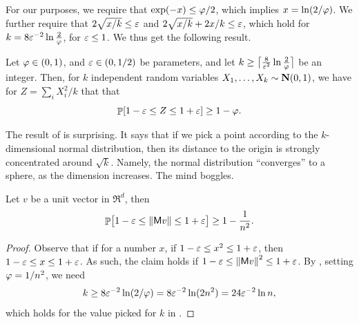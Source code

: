 For our purposes, we require that $\exp(-x) \leq \varphi/2$, which
implies $x = \ln( 2/\varphi)$. We further require that
$2 \sqrt{ x/k} \leq {\varepsilon}$ and $2 \sqrt{ x/k} + 2x/k \leq {\varepsilon}$, which
hold for $k = 8{\varepsilon}^{-2} \ln \frac{2}{\varphi}$, for ${\varepsilon} \leq 1$.
We thus get the following result.

\begin{corollary}
    Let $\varphi \in (0,1)$, and ${\varepsilon} \in (0,1/2)$ be parameters,
    and let
    $k \geq \bigl\lceil{\frac{8}{{\varepsilon}^2} \ln
       \frac{2}{\varphi}}\bigr\rceil$ be an integer. Then, for $k$
    independent random variables
    $X_1, \ldots, X_k \sim \NormalY{0}{1}$, we have for
    $Z = \sum_i X_i^2/k$ that that
    \begin{equation*}
        \Prob{ 1-\eps \leq Z \leq 1+\eps} \geq 1 - \BadProb.
    \end{equation*}
\end{corollary}


\begin{remark}
    The result of  is surprising. It says that if we
    pick a point according to the $k$-dimensional normal distribution,
    then its distance to the origin is strongly concentrated around
    $\sqrt{k}$. Namely, the normal distribution ``converges'' to a
    sphere, as the dimension increases. The mind boggles.
\end{remark}


\begin{lemma}
    Let $v$ be a unit vector in $\Re^d$, then
    \begin{equation*}
        \Prob{ 1-\eps \leq  \norm{\Matrix v } \leq 1+\eps \bigr.}%
        \geq
        1- \frac{1}{n^2}. 
    \end{equation*}
\end{lemma}
\begin{proof}
    Observe that if for a number $x$, if
    $1-{\varepsilon} \leq x^2 \leq 1+{\varepsilon}$, then $1-{\varepsilon} \leq x \leq
    1+{\varepsilon}$. As such, the claim holds if
    $1-{\varepsilon} \leq \left\| {\mathsf{M} v } \right\|^2 \leq 1+{\varepsilon}$.  By ,
    setting $\varphi = 1/n^2$, we need
    \begin{equation*}
        k%
        \geq%
        8\eps^{-2}\ln (2/\BadProb)
        =
        8 \eps^{-2} \ln (2n^2)%
        =%
        24 \eps^{-2} \ln n,
    \end{equation*}
    which holds for the value picked for $k$ in 
    .
\end{proof}


